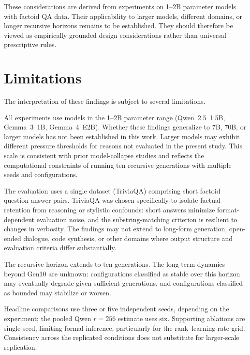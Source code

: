 \documentclass[a4paper,fleqn]{cas-dc}
\newif\ifshowchanges
\newcommand{\rev}[1]{\ifshowchanges{\color{blue}#1}\else{#1}\fi}
\begin{document}
These considerations are derived from experiments on 1--2B parameter models with
factoid QA data. Their applicability to larger models, different domains, or
longer recursive horizons remains to be established. They should therefore be
viewed as empirically grounded design considerations rather than universal
prescriptive rules.

\FloatBarrier
\section{Limitations}\label{sec:limitations}

The interpretation of these findings is subject to several limitations.

All experiments use models in the 1--2B parameter range (Qwen~2.5~1.5B,
Gemma~3~1B, Gemma~4~E2B). Whether these findings generalize to 7B, 70B, or
larger models has not been established in this work. Larger models may exhibit
different pressure thresholds for reasons not evaluated in the present study.
This scale is consistent with prior model-collapse studies
\citep{shumailov2024,keisha2025} and reflects the computational constraints of
running ten recursive generations with multiple seeds and configurations.

The evaluation uses a single dataset (TriviaQA) comprising short factoid
question-answer pairs. TriviaQA was chosen specifically to isolate factual
retention from reasoning or stylistic confounds: short answers minimize
format-dependent evaluation noise, and the substring-matching criterion is
resilient to changes in verbosity. The findings may not extend to long-form
generation, open-ended dialogue, code synthesis, or other domains where output
structure and evaluation criteria differ substantially.

The recursive horizon extends to ten generations. The long-term dynamics beyond
Gen10 are unknown: configurations classified as stable over this horizon
may eventually degrade given sufficient generations, and configurations
classified as bounded may stabilize or worsen.

Headline comparisons use three or five independent seeds, depending on
the experiment; the pooled Qwen $r=256$ estimate uses six. \rev{Supporting
ablations are single-seed, limiting formal inference, particularly for
the rank--learning-rate grid. Consistency across the replicated
conditions does not substitute for larger-scale replication.}
\end{document}
